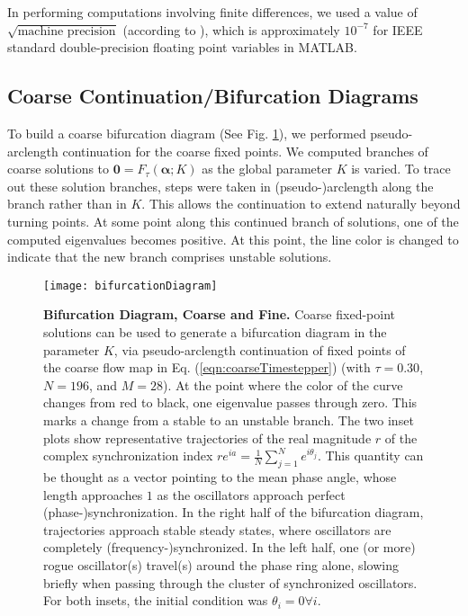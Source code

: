 \documentclass[numbers]{frontiersSCNS}
\renewcommand{\vec}[1]{\bm{#1}}
\newcommand{\numNodes}{{N}}
\newcommand{\couplingK}{{K}}
\newcommand{\numCofs}{{M}}
\newcommand{\figRef}[1]{Fig. \ref{fig:#1}}
\newcommand{\eqnRef}[1]{Eq. (\ref{eqn:#1})}
\DeclareRobustCommand{\inTstep}{\tau}
\newcommand{\pseudoArclengthTauVal}{0.30}
\newcommand{\eigcompsNval}{196}
\newcommand{\eigcompsMval}{28}
\begin{document}
In performing computations involving finite differences, we used a value of
$\sqrt{\text{machine precision}}$ (according to \cite{Press1987}), which is approximately $10^{-7}$
for IEEE standard double-precision floating point variables in MATLAB.







\subsection{Coarse Continuation/Bifurcation Diagrams}

%
To build a coarse bifurcation diagram (See \figRef{bifurcation}),
we performed pseudo-arclength continuation \cite{Keller1977,Kelley2005} for the coarse
fixed points.
%
We computed branches of coarse solutions to
$\vec 0 = F_{\inTstep}(\vec \alpha; \couplingK)$ as the global parameter $\couplingK$ is varied.
%
To trace out these solution branches, steps were taken in (pseudo-)arclength along the branch
rather than in $\couplingK$.
%
This allows the continuation to extend naturally beyond turning points.
%
At some point along this continued branch of solutions,
one of the computed eigenvalues becomes positive.
%
At this point, the line color is changed to indicate that the new branch
comprises unstable solutions.
%

%
\setcounter{subfigure}{0}\begin{figure}[ht]
    \centering
    \texttt{[image: bifurcationDiagram]}
    \caption{
    \textbf{Bifurcation Diagram, Coarse and Fine.}
    Coarse fixed-point solutions
    can be used to generate a bifurcation diagram in the parameter $\couplingK$,
    via pseudo-arclength continuation of fixed points of the coarse flow map
    in \eqnRef{coarseTimestepper}
    (with ${\inTstep}=\pseudoArclengthTauVal$,
    $N=\eigcompsNval$,
    and $\numCofs=\eigcompsMval$).
    At the point where the color of the curve changes from red to black,
    one eigenvalue passes through zero.
    This marks a change from a stable to an unstable branch.
    The two inset plots show representative trajectories
    of the real magnitude $r$ of the complex synchronization index
    $r e^{ i a } = \frac{1}{\numNodes} \sum_{j=1}^\numNodes e^{i \theta_j}$.
    This quantity can be thought as a vector pointing to the mean phase angle,
    whose length approaches $1$ as the oscillators approach perfect (phase-)synchronization.
    In the right half of the bifurcation diagram, trajectories approach stable steady states,
    where oscillators are completely (frequency-)synchronized.
    In the left half, one (or more) rogue oscillator(s) travel(s)
    around the phase ring alone, slowing briefly
    when passing through the cluster of synchronized oscillators.
    For both insets, the initial condition was $\theta_i=0\forall i$.
    }
    \label{fig:bifurcation}
\end{figure}
%
\end{document}
